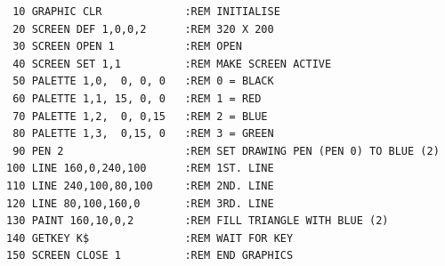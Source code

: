 \begin{description}[leftmargin=2cm,style=nextline]
\begin{tcolorbox}[colback=black,coltext=white]
\verbatimfont{\codefont}
\begin{verbatim}
 10 GRAPHIC CLR             :REM INITIALISE
 20 SCREEN DEF 1,0,0,2      :REM 320 X 200
 30 SCREEN OPEN 1           :REM OPEN
 40 SCREEN SET 1,1          :REM MAKE SCREEN ACTIVE
 50 PALETTE 1,0,  0, 0, 0   :REM 0 = BLACK
 60 PALETTE 1,1, 15, 0, 0   :REM 1 = RED
 70 PALETTE 1,2,  0, 0,15   :REM 2 = BLUE
 80 PALETTE 1,3,  0,15, 0   :REM 3 = GREEN
 90 PEN 2                   :REM SET DRAWING PEN (PEN 0) TO BLUE (2)
100 LINE 160,0,240,100      :REM 1ST. LINE
110 LINE 240,100,80,100     :REM 2ND. LINE
120 LINE 80,100,160,0       :REM 3RD. LINE
130 PAINT 160,10,0,2        :REM FILL TRIANGLE WITH BLUE (2)
140 GETKEY K$               :REM WAIT FOR KEY
150 SCREEN CLOSE 1          :REM END GRAPHICS
\end{verbatim}
\end{tcolorbox}
\end{description}


\newpage
